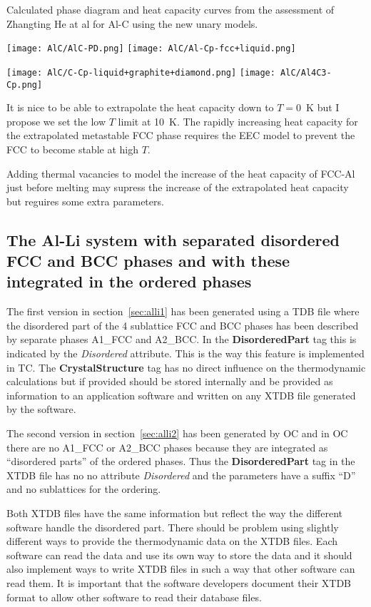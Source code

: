 \documentclass{article}
\begin{document}
\begin{appendices}
\newpage

Calculated phase diagram and heat capacity curves from the assessment
of Zhangting He at al for Al-C using the new unary models.


\texttt{[image: AlC/AlC-PD.png]}
\texttt{[image: AlC/Al-Cp-fcc+liquid.png]}

\texttt{[image: AlC/C-Cp-liquid+graphite+diamond.png]}
\texttt{[image: AlC/Al4C3-Cp.png]}

It is nice to be able to extrapolate the heat capacity down to $T=0$~K
but I propose we set the low $T$ limit at 10~K.  The rapidly
increasing heat capacity for the extrapolated metastable FCC phase
requires the EEC model to prevent the FCC to become stable at high $T$.

Adding thermal vacancies to model the increase of the heat capacity of
FCC-Al just before melting may supress the increase of the
extrapolated heat capacity but reguires some extra parameters.

\newpage

\subsection{The Al-Li system with separated disordered FCC and BCC phases
  and with these integrated in the ordered phases}

The first version in section~\ref{sec:alli1} has been generated using
a TDB file where the disordered part of the 4 sublattice FCC and BCC
phases has been described by separate phases A1\_FCC and A2\_BCC.  In
the {\bf DisorderedPart} tag this is indicated by the {\em Disordered}
attribute.  This is the way this feature is implemented in TC.  The
{\bf CrystalStructure} tag has no direct influence on the
thermodynamic calculations but if provided should be stored internally
and be provided as information to an application software and written
on any XTDB file generated by the software.

The second version in section~\ref{sec:alli2} has been generated by OC
and in OC there are no A1\_FCC or A2\_BCC phases because they are
integrated as ``disordered parts'' of the ordered phases.  Thus the
{\bf DisorderedPart} tag in the XTDB file has no no attribute {\em
  Disordered} and the parameters have a suffix ``D'' and no
sublattices for the ordering.

Both XTDB files have the same information but reflect the way the
different software handle the disordered part.  There should be
problem using slightly different ways to provide the thermodynamic
data on the XTDB files.  Each software can read the data and use its
own way to store the data and it should also implement ways to write
XTDB files in such a way that other software can read them.  It is
important that the software developers document their XTDB format to
allow other software to read their database files.


\end{appendices}
\end{document}
